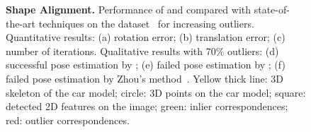 \begin{figure}[h]
\begin{center}
\begin{minipage}{\textwidth}
\begin{tabular}{ccc}
		\end{tabular}
	\end{minipage}
	\vspace{-3mm} 
	\caption{
{\bf Shape Alignment.} Performance of \GNCGM and \GNCTLS compared with state-of-the-art techniques on the \FGCar dataset~\cite{Lin14eccv-modelFitting} for increasing outliers.  
Quantitative results: (a) rotation error; (b) translation error; (c) number of iterations. 
Qualitative results with 70\% outliers: (d) successful pose estimation by \GNCGM; 
(e) failed pose estimation by \ransac; (f) failed pose estimation by Zhou's method~\cite{Zhou17pami-shapeEstimationConvex}. 
Yellow thick line: 3D skeleton of the car model; circle: 3D points on the car model; square: detected 2D features on the image; green: inlier correspondences; red: outlier correspondences. %
	\label{fig:shapeAlignment}}
	\vspace{-9mm} 
	\end{center}
\end{figure}